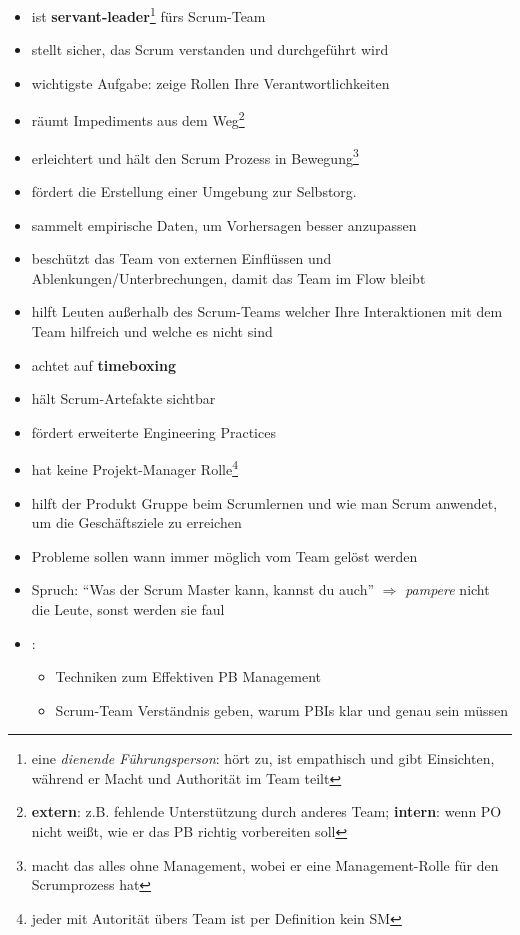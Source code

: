 \begin{itemize}
  \item ist \textbf{servant-leader}\footnote{eine \textit{dienende Führungsperson}: hört zu, ist empathisch und gibt Einsichten,
      während er Macht und Authorität im Team teilt} fürs Scrum-Team
  \item stellt sicher, das Scrum verstanden und durchgeführt wird
  \item wichtigste Aufgabe: zeige Rollen Ihre Verantwortlichkeiten
  \item räumt Impediments aus dem Weg\footnote{\textbf{extern}: z.B. fehlende Unterstützung durch
      anderes Team; \textbf{intern}: wenn PO nicht weißt, wie er das PB richtig vorbereiten soll}
  \item erleichtert und hält den Scrum Prozess in Bewegung\footnote{macht das alles ohne Management,
      wobei er eine Management-Rolle für den Scrumprozess hat}
  \item fördert die Erstellung einer Umgebung zur Selbstorg.
  \item sammelt empirische Daten, um Vorhersagen besser anzupassen
  \item beschützt das Team von externen Einflüssen und Ablenkungen/Unterbrechungen, damit das Team im Flow bleibt
  \item hilft Leuten außerhalb des Scrum-Teams welcher Ihre Interaktionen mit dem Team hilfreich und welche es nicht sind
  \item achtet auf \textbf{timeboxing}
  \item hält Scrum-Artefakte sichtbar
  \item fördert erweiterte Engineering Practices
  \item hat keine Projekt-Manager Rolle\footnote{jeder mit Autorität übers Team ist per Definition kein SM}
  \item hilft der Produkt Gruppe beim Scrumlernen und wie man Scrum anwendet, um die
    Geschäftsziele zu erreichen
  \item Probleme sollen wann immer möglich vom Team gelöst werden
  \item Spruch: \enquote{Was der Scrum Master kann, kannst du auch} $\Rightarrow$
    \textit{pampere}
    nicht die Leute, sonst werden sie faul
  \item {}:
    \begin{itemize}
      \item Techniken zum Effektiven PB Management
      \item Scrum-Team Verständnis geben, warum PBIs klar und genau sein müssen

\end{itemize}
\end{itemize}
